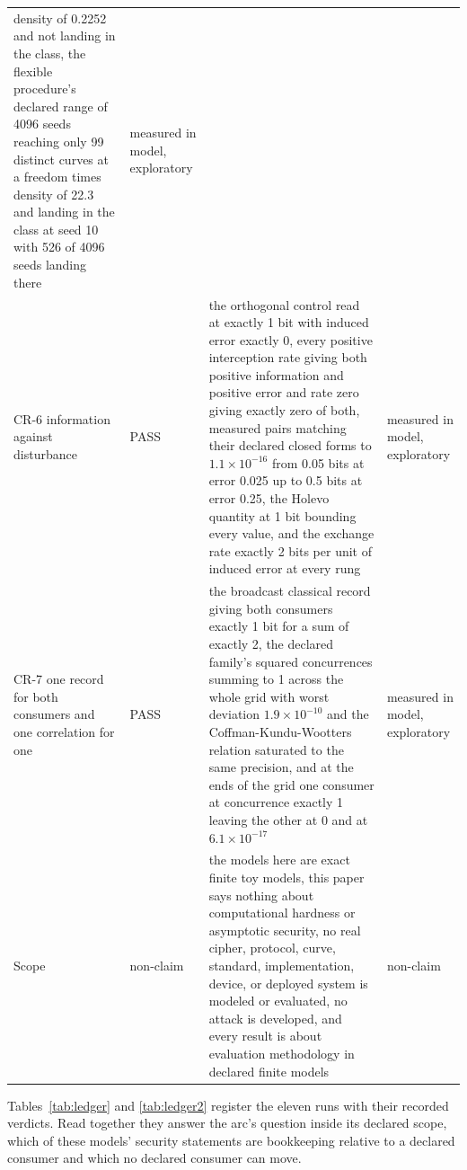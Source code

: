 \documentclass[aps,pre,reprint,nofootinbib]{revtex4-2}
\begin{document}
\begin{table}[t]
\begin{ruledtabular}
\begin{tabular}{L{2.6cm}lL{9.6cm}L{2.9cm}}
density of 0.2252 and not landing in the class, the flexible
procedure's declared range of 4096 seeds reaching only 99 distinct
curves at a freedom times density of 22.3 and landing in the class at
seed 10 with 526 of 4096 seeds landing there
& measured in model, exploratory \\
CR-6 information against disturbance & PASS & the orthogonal control
read at exactly 1 bit with induced error exactly 0, every positive
interception rate giving both positive information and positive error
and rate zero giving exactly zero of both, measured pairs matching
their declared closed forms to $1.1\times10^{-16}$ from 0.05 bits at
error 0.025 up to 0.5 bits at error 0.25, the Holevo quantity at 1 bit
bounding every value, and the exchange rate
exactly 2 bits per unit of induced error at every rung & measured in
model, exploratory \\
CR-7 one record for both consumers and one correlation for one & PASS
& the broadcast classical record giving both consumers exactly 1 bit
for a sum of exactly 2, the declared family's squared concurrences
summing to 1 across the whole grid with worst deviation
$1.9\times10^{-10}$ and the Coffman-Kundu-Wootters relation saturated
to the same precision, and at the ends of the grid one consumer at
concurrence exactly 1 leaving the other at 0 and at
$6.1\times10^{-17}$ & measured in model, exploratory \\
Scope & non-claim & the models here are exact finite toy models, this
paper says nothing about computational hardness or asymptotic
security, no real cipher, protocol, curve, standard, implementation,
device, or deployed system is modeled or evaluated, no attack is
developed, and every result is about evaluation methodology in
declared finite models & non-claim \\
\end{tabular}
\end{ruledtabular}
\end{table}

Tables~\ref{tab:ledger} and \ref{tab:ledger2} register the eleven runs
with their recorded verdicts.  Read together they answer the arc's
question inside its declared scope, which of these models' security
statements are bookkeeping relative to a declared consumer and which
no declared consumer can move.
\end{document}
